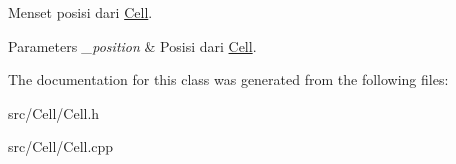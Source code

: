 Menset posisi dari \hyperlink{classCell}{Cell}. 


\begin{DoxyParams}{Parameters}
{\em \+\_\+position} & Posisi dari \hyperlink{classCell}{Cell}. \\
\hline
\end{DoxyParams}


The documentation for this class was generated from the following files\+:\begin{DoxyCompactItemize}
\item 
src/\+Cell/Cell.\+h\item 
src/\+Cell/Cell.\+cpp\end{DoxyCompactItemize}
